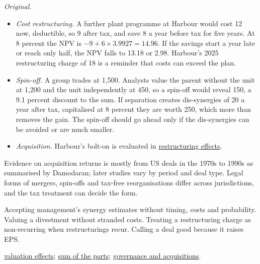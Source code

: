 \begin{qfmethod}
 \emph{Original.}
\begin{itemize}
\item \emph{Cost restructuring.} A further plant programme at Harbour would cost 12 now, deductible, so 9 after tax, and save 8 a year before tax for five years. At 8 percent the NPV is $-9+6\times3.9927=14.96$. If the savings start a year late or reach only half, the NPV falls to 13.18 or 2.98. Harbour's 2025 restructuring charge of 18 is a reminder that costs can exceed the plan.
\item \emph{Spin-off.} A group trades at 1,500. Analysts value the parent without the unit at 1,200 and the unit independently at 450, so a spin-off would reveal 150, a 9.1 percent discount to the sum. If separation creates dis-synergies of 20 a year after tax, capitalised at 8 percent they are worth 250, which more than removes the gain. The spin-off should go ahead only if the dis-synergies can be avoided or are much smaller.
\item \emph{Acquisition.} Harbour's bolt-on is evaluated in \hyperref[ex:restructuring-valuation-effects]{restructuring effects}.
\end{itemize}

 Evidence on acquisition returns is mostly from US deals in the 1970s to 1990s as summarised by Damodaran; later studies vary by period and deal type. Legal forms of mergers, spin-offs and tax-free reorganisations differ across jurisdictions, and the tax treatment can decide the form.

 Accepting management's synergy estimates without timing, costs and probability. Valuing a divestment without stranded costs. Treating a restructuring charge as non-recurring when restructurings recur. Calling a deal good because it raises EPS.

 \hyperref[ex:restructuring-valuation-effects]{valuation effects}; \hyperref[meth:valuation-approach-choice]{sum of the parts}; \hyperref[meth:corporate-governance-evaluation]{governance and acquisitions}.

\end{qfmethod}

